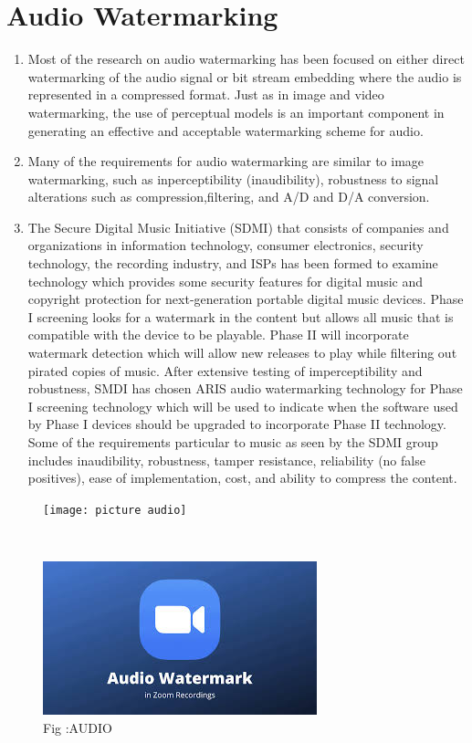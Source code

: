\documentclass[12pt]{IEeetran}
\begin{document}
\section{Audio Watermarking}
\begin{enumerate}
\item Most of the research on audio watermarking has been focused on either direct watermarking of the audio signal or
bit stream embedding where the audio is represented in a
compressed format. Just as in image and video
watermarking, the use of perceptual models is an important component in generating an effective and acceptable
watermarking scheme for audio.

\item Many of the requirements for audio watermarking are similar to image watermarking, such as inperceptibility (inaudibility), robustness to signal alterations such as compression,filtering, and A/D and D/A conversion.
\item  The Secure Digital Music Initiative (SDMI) that consists of companies and organizations in information technology, consumer electronics, security technology, the
recording industry, and ISPs has been formed to examine
technology which provides some security features for
digital music and copyright protection for
next-generation portable digital music devices. Phase I
screening looks for a watermark in the content but allows
all music that is compatible with the device to be playable.
Phase II will incorporate watermark detection which will
allow new releases to play while filtering out pirated copies of music. After extensive testing of imperceptibility
and robustness, SMDI has chosen ARIS audio
watermarking technology for Phase I screening technology which will be used to indicate when the software used
by Phase I devices should be upgraded to incorporate
Phase II technology. Some of the requirements particular
to music as seen by the SDMI group includes inaudibility,
robustness, tamper resistance, reliability (no false
positives), ease of implementation, cost, and ability to
compress the content.
\end{enumerate}
\centering
\begin{subfigure}{\linewidth}
\texttt{[image: picture audio]}
\end{subfigure}\\
\begin{subfigure}{\linewidth}
\includegraphics[width=\linewidth]{video}
\caption{Fig :AUDIO }
\end{subfigure}\\
\end{document}
